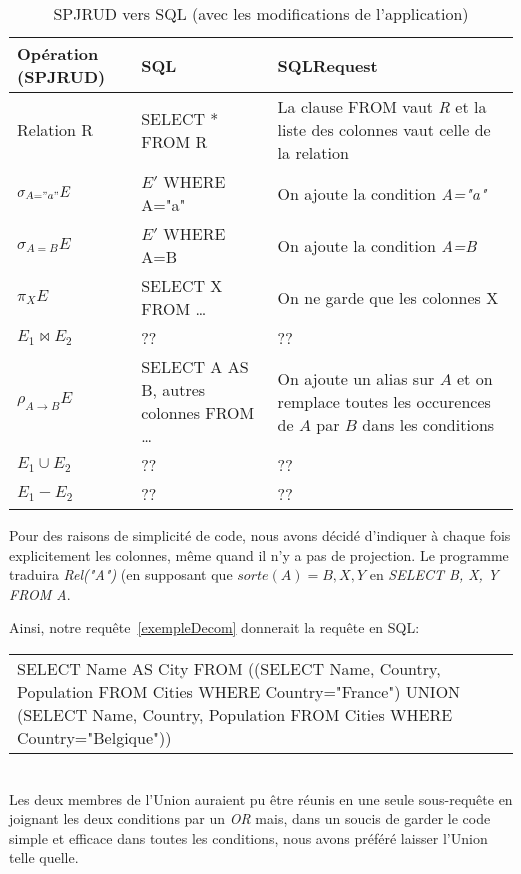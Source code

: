 \documentclass[]{article}
\begin{document}
\begin{table}[H]
	\centering
	\begin{tabular}{| l | p{100px} | p{100px} |}
		\hline
		Op\'eration (SPJRUD) & SQL & SQLRequest\\
		\hline
		Relation R & SELECT * FROM R & La clause FROM vaut \textit{R} et la liste des colonnes vaut celle de la relation\\
		\hline
		$\sigma_{A="a"} E$ & $E'$ WHERE A="a" & On ajoute la condition \textit{A="a"}\\
		\hline
		$\sigma_{A=B} E$ & $E'$ WHERE A=B & On ajoute la condition \textit{A=B}\\
		\hline
		$\pi_X E$ & SELECT X FROM \ldots & On ne garde que les colonnes X\\
		\hline
		$E_1 \bowtie E_2$ & ?? & ??\\
		\hline
		$\rho_{A \to B} E$ & SELECT A AS B, autres colonnes FROM \ldots & On ajoute un alias sur $A$ et on remplace toutes les occurences de $A$ par $B$ dans les conditions\\
		\hline
		$E_1 \cup E_2$ & ?? & ??\\
		\hline
		$E_1 - E_2$ & ?? & ??\\
		\hline
	\end{tabular}
	\caption{SPJRUD vers SQL (avec les modifications de l'application)}
\end{table}

Pour des raisons de simplicit\'e de code, nous avons d\'ecid\'e d'indiquer \`a chaque fois explicitement les colonnes, m\^eme quand il n'y a pas de projection. Le programme traduira \textit{Rel("A")} (en supposant que $sorte(A)={B, X, Y}$ en \textit{SELECT B, X, Y FROM A}.

Ainsi, notre requ\^ete~\ref{exempleDecom} donnerait la requ\^ete en SQL:\\

\begin{tabular}{p{275px}}
	SELECT Name AS City FROM ((SELECT Name, Country, Population FROM Cities WHERE Country="France") UNION (SELECT Name, Country, Population FROM Cities WHERE Country="Belgique"))
\end{tabular}
\\

Les deux membres de l'Union auraient pu \^etre r\'eunis en une seule sous-requ\^ete en joignant les deux conditions par un \textit{OR} mais, dans un soucis de garder le code simple et efficace dans toutes les conditions, nous avons pr\'ef\'er\'e laisser l'Union telle quelle.
\end{document}
